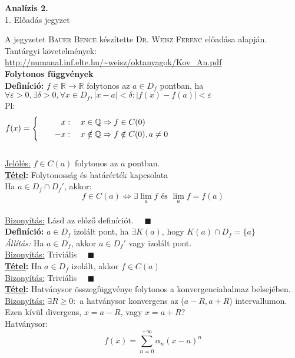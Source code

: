 \documentclass[a4paper,11pt]{article}
\begin{document}
\def\biz{\normalsize{\textbf{\underline{Bizonyítás:} }\hspace*{0.3cm}}}
\def\tetel{\large \textbf{Tétel: }}
\def\defi{\normalsize \textbf{Definíció: }}
\setlength\parindent{0pt}
\def\Z{\mathbb{Z}}
\def\Q{\mathbb{Q}}
\def\R{\mathbb{R}}
\def\N{\mathbb{N}}
\def\sume{\displaystyle\sum_{n=1}^{+\infty}}
\def\sumn{\displaystyle\sum_{n=0}^{+\infty}}
\def\biz{\normalsize{\underline{Bizonyítás:} }\hspace*{0.5cm}}
\def\tetel{\normalsize \textbf{\underline{Tétel}: }}
\def\narrow{\underset{n\rightarrow+\infty}{\longrightarrow}}
\def\limn{\displaystyle\lim_{n\to +\infty}}
\begin{center}
	{\LARGE\textbf{Analízis 2.}}\\[0.2cm]
	
	{\Large 1. Előadás jegyzet}\\[1cm]	
\end{center}
{\small A jegyzetet \textsc{Bauer Bence} készítette \textsc{Dr. Weisz Ferenc} előadása alapján.}\\[0.2cm]
Tantárgyi követelmények: \url{http://numanal.inf.elte.hu/~weisz/oktanyagok/Kov_An.pdf}\\[0.2cm]
\textbf{{\large Folytonos függvények}}\\[0.1cm]
\defi $f\in\R\to\R$ folytonos az $a\in D_f$ pontban, ha\\[0.2cm] $\forall\varepsilon>0,\exists\delta>0,\forall x\in D_f, |x-a|<\delta : |f(x)-f(a)|<\varepsilon$\\[0.1cm] Pl: \[\displaystyle f(x) = 
\left\{
\begin{gathered}
x: \quad x\in\Q\Rightarrow f\in C(0)\hspace{5.7cm} \\
\quad\quad-x: \quad x\notin\Q\Rightarrow f\notin C(0), a\neq 0\hspace{5.7cm}
\end{gathered}\right. \]\\[0.1cm]
\underline{Jelölés:}  $f\in C(a)$ folytonos az $a$ pontban.\\[0.2cm]
\tetel Folytonosság és határérték kapcsolata\\[0.1cm]
Ha $a\in D_f\cap D_f'$, akkor: \[ f\in C(a)\Leftrightarrow \exists\lim_a f \text{ és } \lim_a f=f(a)\]\\[0.1cm]
\biz Lásd az előző definíciót. $\quad\blacksquare$\\[0.3cm]
\defi $a\in D_f$ izolált pont, ha $\exists K(a)$, hogy $K(a)\cap D_f=\{a\}$\\[0.1cm] \textit{Állítás:} Ha $a\in D_f$, akkor $a\in D_f'$ vagy izolált pont.\\[0.1cm]\biz Triviális $\quad\blacksquare$\\[0.2cm] \tetel Ha $a\in D_f$ izolált, akkor $f\in C(a)$\\[0.1cm]\biz Triviális $\quad\blacksquare$\\[0.2cm] \tetel Hatványsor összegfüggvénye folytonos a konvergenciahalmaz belsejében.\\[0.1cm] \biz $\exists R\geq0:$ a hatványsor konvergens az ($a-R,a+R$) intervallumon.\\[0.1cm]Ezen kívül divergens, $x=a-R$, vagy $x=a+R$?\\[0.1cm]Hatványsor:\[f(x)=\sumn \alpha_n(x-a)^n\]
\end{document}
